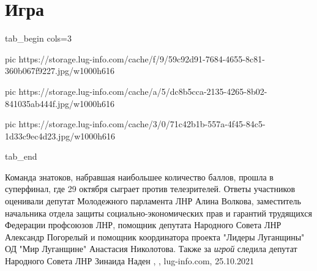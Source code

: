  
 
 
 
 
\chapter{Игра}


\ifcmt
  tab_begin cols=3

     pic https://storage.lug-info.com/cache/f/9/59c92d91-7684-4655-8c81-360b067f9227.jpg/w1000h616

     pic https://storage.lug-info.com/cache/a/5/dc8b5cca-2135-4265-8b02-841035ab444f.jpg/w1000h616

     pic https://storage.lug-info.com/cache/3/0/71c42b1b-557a-4f45-84c5-1d33c9ec4d23.jpg/w1000h616

  tab_end
\fi

Команда знатоков, набравшая наибольшее количество баллов, прошла в суперфинал,
где 29 октября сыграет против телезрителей.  Ответы участников оценивали
депутат Молодежного парламента ЛНР Алина Волкова, заместитель начальника отдела
защиты социально-экономических прав и гарантий трудящихся Федерации профсоюзов
ЛНР, помощник депутата Народного Совета ЛНР Александр Погорелый и помощник
координатора проекта "Лидеры Луганщины" ОД "Мир Луганщине" Анастасия
Николотова. Также за \emph{игрой} следила депутат Народного Совета ЛНР Зинаида
Наден
, 
, lug-info.com, 25.10.2021
